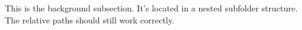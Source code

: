 This is the background subsection.
It's located in a nested subfolder structure.
The relative paths should still work correctly. 
